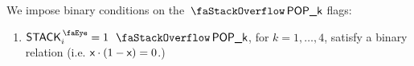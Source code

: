We impose binary conditions on the $\stackItemPop{k}$ flags:
\begin{enumerate}
	\item \If $\peekStack_{i} = 1$ \Then $\stackItemPop{k}$, for $k=1,\dots,4$, satisfy a binary relation (i.e. $\textsf{x} \cdot (1 - \textsf{x}) = 0$.)
\end{enumerate}